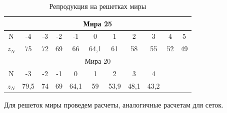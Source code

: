 \documentclass[a4paper, 12pt]{article}
\begin{document}
\begin{enumerate}
	 	\begin{table}[h]
		\centering
		\begin{tabular}{|c|c|c|c|c|c|c|c|c|c|c|}
			\hline
			\multicolumn{11}{|c|}{Мира 25}                                                                    \\ \hline
			N    & -4   & -3 & -2 & -1   & 0    & 1    & 2    & 3    & 4                  & 5                 \\ 
			\hline
			$z_N$ & 75   & 72 & 69 & 66   & 64,1 & 61   & 58   & 55   & 52                 & 49                \\
			\hline
			\multicolumn{11}{|c|}{Мира 20}                                                                    \\ \hline
			N    & -3   & -2 & -1 & 0    & 1    & 2    & 3    & 4    & \multicolumn{2}{c|}{\multirow{2}{*}{}} \\
			\cline{1-9}
			$z_N$ & 79,5 & 74 & 69 & 64,1 & 59   & 53,9 & 48,1 & 43,2 & \multicolumn{2}{c|}{}                  \\
			\hline
		\end{tabular}
		\label{mira_table}
		\caption{Репродукция на решетках миры}
	\end{table}
	\end{enumerate}
	Для решеток миры проведем расчеты, аналогичные расчетам для сеток.\par
\end{document}
